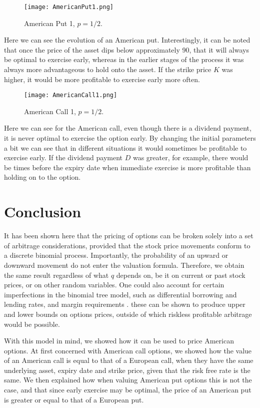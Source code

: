 \documentclass[letterpaper,12pt]{article}
\theoremstyle{plain}
\numberwithin{equation}{section}
\begin{document}
\begin{figure}[H]
  \texttt{[image: AmericanPut1.png]}
  \caption{American Put 1, $p = 1/2$.}
  \label{fig:boat1}
\end{figure}

Here we can see the evolution of an American put. Interestingly, it can be noted that once the price of the asset dips below approximately 90, that it will always be optimal to exercise early, whereas in the earlier stages of the process it was always more advantageous to hold onto the asset. If the strike price $K$ was higher, it would be more profitable to exercise early more often.
\newpage
\begin{figure}[H]
  \texttt{[image: AmericanCall1.png]}
  \caption{American Call 1, $p = 1/2$.}
  \label{fig:boat1}
\end{figure}

Here we can see for the American call, even though there is a dividend payment, it is never optimal to exercise the option early. By changing the initial parameters a bit we can see that in different situations it would sometimes be profitable to exercise early. If the dividend payment $D$ was greater, for example, there would be times before the expiry date when immediate exercise is more profitable than holding on to the option.
\newpage

\section{Conclusion}

It has been shown here that the pricing of options can be broken solely into a set of arbitrage considerations, provided that the stock price movements conform to a discrete binomial process. Importantly, the probability of an upward or downward movement do not enter the valuation formula. Therefore, we obtain the same result regardless of what $q$ depends on, be it on current or past stock prices, or on other random variables. One could also account for certain imperfections in the binomial tree model, such as differential borrowing and lending rates, and margin requirements \cite{CRR}. these can be shown to produce upper and lower bounds on options prices, outside of which riskless profitable arbitrage would be possible.

With this model in mind, we showed how it can be used to price American options. At first concerned with American call options, we showed how the value of an American call is equal to that of a European call, when they have the same underlying asset, expiry date and strike price, given that the risk free rate is the same. We then explained how when valuing American put options this is not the case, and that since early exercise may be optimal, the price of an American put is greater or equal to that of a European put.
\end{document}
